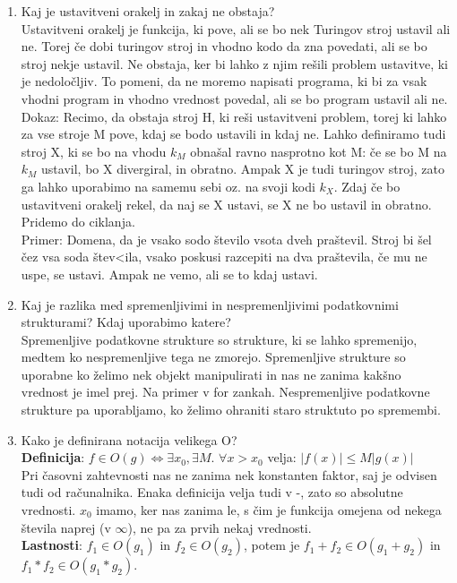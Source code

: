 \documentclass[a4paper]{article}
\begin{document}
\begin{enumerate}
        \item Kaj je ustavitveni orakelj in zakaj ne obstaja?\\
        Ustavitveni orakelj je funkcija, ki pove, ali se bo nek Turingov stroj ustavil ali ne. Torej če dobi turingov stroj in vhodno kodo da zna povedati, ali se bo stroj nekje ustavil. Ne obstaja, ker bi lahko z njim rešili problem ustavitve, ki je nedoločljiv. To pomeni, da ne moremo napisati programa, ki bi za vsak vhodni program in vhodno vrednost povedal, ali se bo program ustavil ali ne.\\
        Dokaz: Recimo, da obstaja stroj H, ki reši ustavitveni problem, torej ki lahko za vse stroje M pove, kdaj se bodo ustavili in kdaj ne. Lahko definiramo tudi stroj X, ki se bo na vhodu $k_M$ obnašal ravno nasprotno kot M: če se bo M na $k_M$ ustavil, bo X divergiral, in obratno. Ampak X je tudi turingov stroj, zato ga lahko uporabimo na samemu sebi oz. na svoji kodi $k_X$. Zdaj če bo ustavitveni orakelj rekel, da naj se X ustavi, se X ne bo ustavil in obratno. Pridemo do ciklanja.\\
        Primer: Domena, da je vsako sodo število vsota dveh praštevil. Stroj bi šel čez vsa soda štev<ila, vsako poskusi razcepiti na dva praštevila, če mu ne uspe, se ustavi. Ampak ne vemo, ali se to kdaj ustavi.

        \item Kaj je razlika med spremenljivimi in nespremenljivimi podatkovnimi strukturami? Kdaj uporabimo katere?\\
        Spremenljive podatkovne strukture so strukture, ki se lahko spremenijo, medtem ko nespremenljive tega ne zmorejo. Spremenljive strukture so uporabne ko želimo nek objekt manipulirati in nas ne zanima kakšno vrednost je imel prej. Na primer v for zankah. Nespremenljive podatkovne strukture pa uporabljamo, ko želimo ohraniti staro struktuto po spremembi.

        \item Kako je definirana notacija velikega O?\\
        \textbf{Definicija}: $f \in O(g) \iff \exists x_0 ,\exists M$. $\forall x > x_0$ velja: $|f(x)| \leq M|g(x)|$\\
        Pri časovni zahtevnosti nas ne zanima nek konstanten faktor, saj je odvisen tudi od računalnika. Enaka definicija velja tudi v -, zato so absolutne vrednosti. $x_0$ imamo, ker nas zanima le, s čim je funkcija omejena od nekega števila naprej (v $\infty$), ne pa za prvih nekaj vrednosti.\\
        \textbf{Lastnosti}: $f_1 \in O(g_1)$ in $f_2 \in O(g_2)$, potem je $f_1 + f_2 \in O(g_1 + g_2)$ in $f_1 * f_2 \in O(g_1 * g_2)$.


\end{enumerate}
\end{document}
